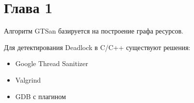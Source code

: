 
\section{Глава 1}

Алгоритм GTSan базируется на построение графа ресурсов.

Для детектирования Deadlock в C/C++ существуют решения:

\begin{itemize}  
\item Google Thread Sanitizer
\item Valgrind
\item GDB с плагином
\end{itemize}

\clearpage